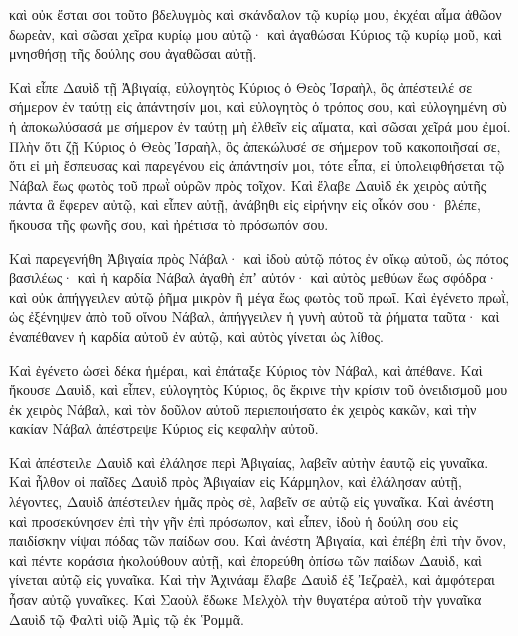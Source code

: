 {καὶ οὐκ ἔσται σοι τοῦτο βδελυγμὸς καὶ σκάνδαλον τῷ κυρίῳ μου, ἐκχέαι αἷμα ἀθῶον δωρεὰν, καὶ σῶσαι χεῖρα κυρίῳ μου αὐτῷ· καὶ ἀγαθώσαι Κύριος τῷ κυρίῳ μοῦ, καὶ μνησθήσῃ τῆς δούλης σου ἀγαθῶσαι αὐτῇ.
\par }{\PP {}Καὶ εἶπε Δαυὶδ τῇ Ἀβιγαίᾳ, εὐλογητὸς Κύριος ὁ Θεὸς Ἰσραὴλ, ὃς ἀπέστειλέ σε σήμερον ἐν ταύτῃ εἰς ἀπάντησίν μοι,
καὶ εὐλογητὸς ὁ τρόπος σου, καὶ εὐλογημένη σὺ ἡ ἀποκωλύσασά με σήμερον ἐν ταύτῃ μὴ ἐλθεῖν εἰς αἵματα, καὶ σῶσαι χεῖρά μου ἐμοί.
Πλὴν ὅτι ζῇ Κύριος ὁ Θεὸς Ἰσραὴλ, ὃς ἀπεκώλυσέ σε σήμερον τοῦ κακοποιῆσαί σε, ὅτι εἰ μὴ ἔσπευσας καὶ παρεγένου εἰς ἀπάντησίν μοι, τότε εἶπα, εἰ ὑπολειφθήσεται τῷ Νάβαλ ἕως φωτὸς τοῦ πρωῒ οὐρῶν πρὸς τοῖχον.
Καὶ ἔλαβε Δαυὶδ ἐκ χειρὸς αὐτῆς πάντα ἃ ἔφερεν αὐτῷ, καὶ εἶπεν αὐτῇ, ἀνάβηθι εἰς εἰρήνην εἰς οἶκόν σου· βλέπε, ἤκουσα τῆς φωνῆς σου, καὶ ἠρέτισα τὸ πρόσωπόν σου.
\par }{\PP {}Καὶ παρεγενήθη Ἀβιγαία πρὸς Νάβαλ· καὶ ἰδοὺ αὐτῷ πότος ἐν οἴκῳ αὐτοῦ, ὡς πότος βασιλέως· καὶ ἡ καρδία Νάβαλ ἀγαθὴ ἐπʼ αὐτόν· καὶ αὐτὸς μεθύων ἕως σφόδρα· καὶ οὐκ ἀπήγγειλεν αὐτῷ ῥῆμα μικρὸν ἢ μέγα ἕως φωτὸς τοῦ πρωΐ.
Καὶ ἐγένετο πρωῒ, ὡς ἐξένηψεν ἀπὸ τοῦ οἴνου Νάβαλ, ἀπήγγειλεν ἡ γυνὴ αὐτοῦ τὰ ῥήματα ταῦτα· καὶ ἐναπέθανεν ἡ καρδία αὐτοῦ ἐν αὐτῷ, καὶ αὐτὸς γίνεται ὡς λίθος.
\par }{\PP {}Καὶ ἐγένετο ὡσεὶ δέκα ἡμέραι, καὶ ἐπάταξε Κύριος τὸν Νάβαλ, καὶ ἀπέθανε.
Καὶ ἤκουσε Δαυὶδ, καὶ εἶπεν, εὐλογητὸς Κύριος, ὃς ἔκρινε τὴν κρίσιν τοῦ ὀνειδισμοῦ μου ἐκ χειρὸς Νάβαλ, καὶ τὸν δοῦλον αὐτοῦ περιεποιήσατο ἐκ χειρὸς κακῶν, καὶ τὴν κακίαν Νάβαλ ἀπέστρεψε Κύριος εἰς κεφαλὴν αὐτοῦ.
\par }{\PP Καὶ ἀπέστειλε Δαυὶδ καὶ ἐλάλησε περὶ Ἀβιγαίας, λαβεῖν αὐτὴν ἑαυτῷ εἰς γυναῖκα.
Καὶ ἦλθον οἱ παῖδες Δαυὶδ πρὸς Ἀβιγαίαν εἰς Κάρμηλον, καὶ ἐλάλησαν αὐτῇ, λέγοντες, Δαυὶδ ἀπέστειλεν ἡμᾶς πρὸς σὲ, λαβεῖν σε αὐτῷ εἰς γυναῖκα.
Καὶ ἀνέστη καὶ προσεκύνησεν ἐπὶ τὴν γῆν ἐπὶ πρόσωπον, καὶ εἶπεν, ἰδοὺ ἡ δούλη σου εἰς παιδίσκην νίψαι πόδας τῶν παίδων σου.
Καὶ ἀνέστη Ἀβιγαία, καὶ ἐπέβη ἐπὶ τὴν ὄνον, καὶ πέντε κοράσια ἠκολούθουν αὐτῇ, καὶ ἐπορεύθη ὀπίσω τῶν παίδων Δαυὶδ, καὶ γίνεται αὐτῷ εἰς γυναῖκα.
Καὶ τὴν Ἀχινάαμ ἔλαβε Δαυὶδ ἐξ Ἰεζραὲλ, καὶ ἀμφότεραι ἦσαν αὐτῷ γυναῖκες.
Καὶ Σαοὺλ ἔδωκε Μελχὸλ τὴν θυγατέρα αὐτοῦ τὴν γυναῖκα Δαυὶδ τῷ Φαλτὶ υἱῷ Ἀμὶς τῷ ἐκ Ῥομμᾶ.

}
